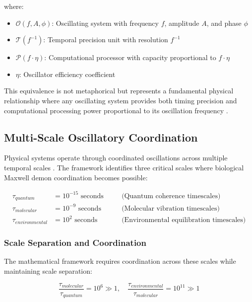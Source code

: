where:
\begin{itemize}
\item $\mathcal{O}(f, A, \phi)$: Oscillating system with frequency $f$, amplitude $A$, and phase $\phi$
\item $\mathcal{T}(f^{-1})$: Temporal precision unit with resolution $f^{-1}$
\item $\mathcal{P}(f \cdot \eta)$: Computational processor with capacity proportional to $f \cdot \eta$
\item $\eta$: Oscillator efficiency coefficient
\end{itemize}

This equivalence is not metaphorical but represents a fundamental physical relationship where any oscillating system provides both timing precision and computational processing power proportional to its oscillation frequency \cite{sachikonye2024oscillatory}.

\subsection{Multi-Scale Oscillatory Coordination}

Physical systems operate through coordinated oscillations across multiple temporal scales \cite{ball2011physics,tegmark2000importance}. The framework identifies three critical scales where biological Maxwell demon coordination becomes possible:

\begin{align}
\tau_{quantum} &= 10^{-15} \text{ seconds} \quad &&\text{(Quantum coherence timescales)} \\
\tau_{molecular} &= 10^{-9} \text{ seconds} \quad &&\text{(Molecular vibration timescales)} \\
\tau_{environmental} &= 10^{2} \text{ seconds} \quad &&\text{(Environmental equilibration timescales)}
\end{align}

\subsubsection{Scale Separation and Coordination}

The mathematical framework requires coordination across these scales while maintaining scale separation:

\begin{equation}
\frac{\tau_{molecular}}{\tau_{quantum}} = 10^{6} \gg 1, \quad \frac{\tau_{environmental}}{\tau_{molecular}} = 10^{11} \gg 1
\end{equation}

